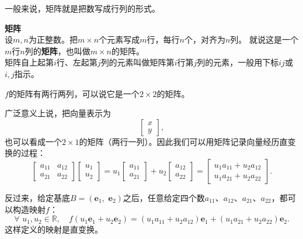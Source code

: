 \documentclass[12pt,UTF8,fontset=none]{ctexbook}
\begin{document}
一般来说，矩阵就是把数写成行列的形式。
\begin{df}{\textbf{矩阵}}
    \mbox{}\\
    设$m,n$为正整数。把$m \times n$个元素写成$m$行，每行$n$个，对齐为$n$列。
    就说这是一个$m$行$n$列的\textbf{矩阵}，也叫做$m \times n$的矩阵。\\
    矩阵自上起第$i$行、左起第$j$列的元素叫做矩阵第$i$行第$j$列的元素，一般用下标$ij$或$i,j$指示。
\end{df}

$f$的矩阵有两行两列，可以说它是一个$2\times 2$的矩阵。

广泛意义上说，把向量表示为
$$ \begin{bmatrix}
    x\\ y
\end{bmatrix},$$
也可以看成一个$2\times 1$的矩阵（两行一列）。因此我们可以用矩阵记录向量经历直变换的过程：
$$ \begin{bmatrix}
    a_{11} & a_{12} \\ a_{21} & a_{22}
\end{bmatrix}\begin{bmatrix}
    u_1\\ u_2
\end{bmatrix} = u_1\begin{bmatrix}
    a_{11}\\ a_{21}
\end{bmatrix} + u_2 \begin{bmatrix}
    a_{12}\\ a_{22}
\end{bmatrix} = \begin{bmatrix}
    u_1a_{11} + u_2a_{12}\\ u_1a_{21} + u_2a_{22} 
\end{bmatrix}.$$

反过来，给定基底$B = (\mathbf{e}_1, \,\,\mathbf{e}_2)$之后，任意给定四个数$a_{11}$、$a_{12}$、$a_{21}$、$a_{22}$，都可以构造映射$f$：
$$ \forall \,\, u_1, u_2 \in \mathbb{R}, \quad  f(u_1\mathbf{e}_1 + u_2\mathbf{e}_2) = (u_1a_{11} + u_2a_{12}) \mathbf{e}_1 + (u_1a_{21} + u_2a_{22}) \mathbf{e}_2.$$
这样定义的映射是直变换。
\end{document}

